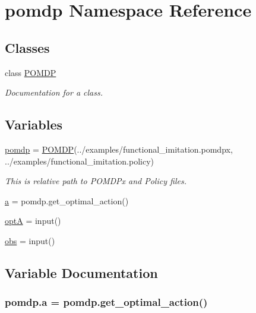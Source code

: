 \hypertarget{namespacepomdp}{}\section{pomdp Namespace Reference}
\label{namespacepomdp}
\subsection*{Classes}
\begin{DoxyCompactItemize}
\item 
class \hyperlink{classpomdp_1_1POMDP}{P\+O\+M\+DP}
\begin{DoxyCompactList}\small\item\em Documentation for a class. \end{DoxyCompactList}\end{DoxyCompactItemize}
\subsection*{Variables}
\begin{DoxyCompactItemize}
\item 
\hyperlink{namespacepomdp_a0b6ef2c8e7953321eef83e0706e8316f}{pomdp} = \hyperlink{classpomdp_1_1POMDP}{P\+O\+M\+DP}(\textquotesingle{}../examples/functional\+\_\+imitation.\+pomdpx\textquotesingle{}, \textquotesingle{}../examples/functional\+\_\+imitation.\+policy\textquotesingle{})
\begin{DoxyCompactList}\small\item\em This is relative path to P\+O\+M\+D\+Px and Policy files. \end{DoxyCompactList}\item 
\hyperlink{namespacepomdp_a20d5c9e1d5715f816ba3fe8860e9b7b2}{a} = pomdp.\+get\+\_\+optimal\+\_\+action()
\item 
\hyperlink{namespacepomdp_a4901c11b2c53920cbc58185f0c1b58b5}{optA} = input()
\item 
\hyperlink{namespacepomdp_a7d45d88aa25dba39219b60c7df2d7756}{obs} = input()
\end{DoxyCompactItemize}


\subsection{Variable Documentation}
\subsubsection[{\texorpdfstring{a}{a}}]{\setlength{\rightskip}{0pt plus 5cm}pomdp.\+a = pomdp.\+get\+\_\+optimal\+\_\+action()}\hypertarget{namespacepomdp_a20d5c9e1d5715f816ba3fe8860e9b7b2}{}\label{namespacepomdp_a20d5c9e1d5715f816ba3fe8860e9b7b2}
